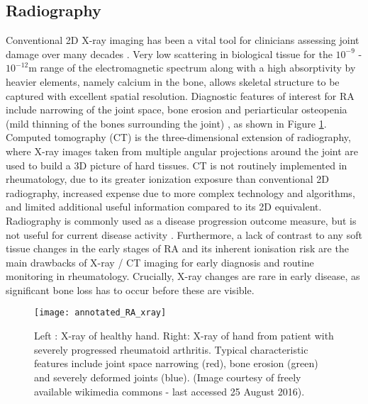 \documentclass[twoside]{bhamthesis}
\theoremstyle{definition}
\begin{document}

\subsection{Radiography}

Conventional 2D X-ray imaging has been a vital tool for clinicians assessing joint damage over many decades \cite{van1996plain}. Very low scattering in biological tissue for the $10^{-9}$ - $10^{-12}$m range of the electromagnetic spectrum along with a high absorptivity by heavier elements, namely calcium in the bone, allows skeletal structure to be captured with excellent spatial resolution. Diagnostic features of interest for RA include narrowing of the joint space, bone erosion and periarticular osteopenia (mild thinning of the bones surrounding the joint) \cite{jacobson2008radiographic}, as shown in Figure \ref{fig:XRAY}. Computed tomography (CT) is the three-dimensional extension of radiography, where X-ray images taken from multiple angular projections around the joint are used to build a 3D picture of hard tissues. CT is not routinely implemented in rheumatology, due to its greater ionization exposure than conventional 2D radiography, increased expense due to more complex technology and algorithms, and limited additional useful information compared to its 2D equivalent. Radiography is commonly used as a disease progression outcome measure, but is not useful for current disease activity \cite{backhaus1999arthritis}. Furthermore, a lack of contrast to any soft tissue changes in the early stages of RA and its inherent ionisation risk are the main drawbacks of X-ray / CT imaging for early diagnosis and routine monitoring in rheumatology. Crucially, X-ray changes are rare in early disease, as significant bone loss has to occur before these are visible.

\begin{figure}[!ht]
\centering
  \texttt{[image: annotated\_RA\_xray]}
\caption{Left : X-ray of healthy hand. Right:  X-ray of hand from patient with severely progressed rheumatoid arthritis. Typical characteristic features include joint space narrowing (red), bone erosion (green) and severely deformed joints (blue). (Image courtesy of freely available wikimedia commons - last accessed 25 August 2016).}
  \label{fig:XRAY}
\end{figure}
\end{document}
